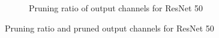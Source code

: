 \documentclass{article}
\begin{document}
\begin{figure}[htbp]
\begin{subfigure}{0.7\textwidth}
\caption{Pruning ratio of output channels for ResNet 50}
\label{fig:ratio_of_channels}
\end{subfigure}
\caption{Pruning ratio and pruned output channels for ResNet 50}
\label{fig:subfigureExample}
\end{figure}
\fi





\end{document}
